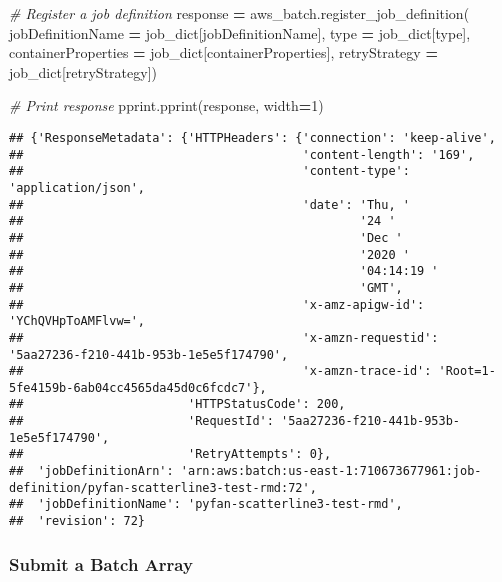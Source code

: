 \documentclass[
]{book}
\newenvironment{Shaded}{\begin{snugshade}}{\end{snugshade}}
\newcommand{\BuiltInTok}[1]{#1}
\newcommand{\CommentTok}[1]{\textcolor[rgb]{0.56,0.35,0.01}{\textit{#1}}}
\newcommand{\DecValTok}[1]{\textcolor[rgb]{0.00,0.00,0.81}{#1}}
\newcommand{\NormalTok}[1]{#1}
\newcommand{\OperatorTok}[1]{\textcolor[rgb]{0.81,0.36,0.00}{\textbf{#1}}}
\newcommand{\StringTok}[1]{\textcolor[rgb]{0.31,0.60,0.02}{#1}}
\begin{document}
\begin{Shaded}
\begin{Highlighting}[]
\CommentTok{\# Register a job definition}
\NormalTok{response }\OperatorTok{=}\NormalTok{ aws\_batch.register\_job\_definition(}
\NormalTok{        jobDefinitionName }\OperatorTok{=}\NormalTok{ job\_dict[}\StringTok{\textquotesingle{}jobDefinitionName\textquotesingle{}}\NormalTok{],}
        \BuiltInTok{type} \OperatorTok{=}\NormalTok{ job\_dict[}\StringTok{\textquotesingle{}type\textquotesingle{}}\NormalTok{],}
\NormalTok{        containerProperties }\OperatorTok{=}\NormalTok{ job\_dict[}\StringTok{\textquotesingle{}containerProperties\textquotesingle{}}\NormalTok{],}
\NormalTok{        retryStrategy }\OperatorTok{=}\NormalTok{ job\_dict[}\StringTok{\textquotesingle{}retryStrategy\textquotesingle{}}\NormalTok{])}

\CommentTok{\# Print response}
\NormalTok{pprint.pprint(response, width}\OperatorTok{=}\DecValTok{1}\NormalTok{)}
\end{Highlighting}
\end{Shaded}

\begin{verbatim}
## {'ResponseMetadata': {'HTTPHeaders': {'connection': 'keep-alive',
##                                       'content-length': '169',
##                                       'content-type': 'application/json',
##                                       'date': 'Thu, '
##                                               '24 '
##                                               'Dec '
##                                               '2020 '
##                                               '04:14:19 '
##                                               'GMT',
##                                       'x-amz-apigw-id': 'YChQVHpToAMFlvw=',
##                                       'x-amzn-requestid': '5aa27236-f210-441b-953b-1e5e5f174790',
##                                       'x-amzn-trace-id': 'Root=1-5fe4159b-6ab04cc4565da45d0c6fcdc7'},
##                       'HTTPStatusCode': 200,
##                       'RequestId': '5aa27236-f210-441b-953b-1e5e5f174790',
##                       'RetryAttempts': 0},
##  'jobDefinitionArn': 'arn:aws:batch:us-east-1:710673677961:job-definition/pyfan-scatterline3-test-rmd:72',
##  'jobDefinitionName': 'pyfan-scatterline3-test-rmd',
##  'revision': 72}
\end{verbatim}

\hypertarget{submit-a-batch-array}{%
\subsubsection{Submit a Batch Array}\label{submit-a-batch-array}}
\end{document}
